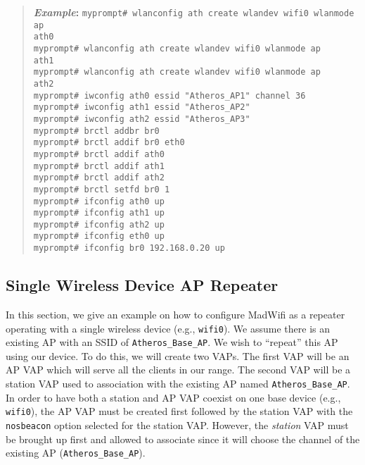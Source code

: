 \documentclass[10pt,fullpage]{article}
\newcommand{\mytt}[1]{{\texttt{#1}}}
\newcommand{\cmd}[1]{{\texttt{myprompt\# #1}}}
\newenvironment{example}{\begin{quote}\textbf{\textit{Example}:}}{\end{quote}}
\begin{document}
\begin{example}
  \cmd{wlanconfig ath create wlandev wifi0 wlanmode ap}\\
  \mytt{ath0}\\
  \cmd{wlanconfig ath create wlandev wifi0 wlanmode ap}\\
  \mytt{ath1}\\
  \cmd{wlanconfig ath create wlandev wifi0 wlanmode ap}\\
  \mytt{ath2}\\
  \cmd{iwconfig ath0 essid "Atheros\_AP1" channel 36}\\
  \cmd{iwconfig ath1 essid "Atheros\_AP2"}\\
  \cmd{iwconfig ath2 essid "Atheros\_AP3"}\\
  \cmd{brctl addbr br0}\\
  \cmd{brctl addif br0 eth0}\\
  \cmd{brctl addif ath0}\\
  \cmd{brctl addif ath1}\\
  \cmd{brctl addif ath2}\\
  \cmd{brctl setfd br0 1}\\
  \cmd{ifconfig ath0 up}\\
  \cmd{ifconfig ath1 up}\\
  \cmd{ifconfig ath2 up}\\
  \cmd{ifconfig eth0 up}\\
  \cmd{ifconfig br0 192.168.0.20 up}
\end{example}

\subsection{Single Wireless Device AP Repeater}
In this section, we give an example on how to configure MadWifi as a
repeater operating with a single wireless device (e.g., \mytt{wifi0}).
We assume there is an existing AP with an SSID of
\mytt{Atheros\_Base\_AP}.  We wish to ``repeat'' this AP using our
device.  To do this, we will create two VAPs.  The first VAP will be
an AP VAP which will serve all the clients in our range.  The second
VAP will be a station VAP used to association with the existing AP
named \mytt{Atheros\_Base\_AP}.  In order to have both a station and
AP VAP coexist on one base device (e.g., \mytt{wifi0}), the AP VAP
must be created first followed by the station VAP with the
\mytt{nosbeacon} option selected for the station VAP.  However, the
\emph{station} VAP must be brought up first and allowed to associate
since it will choose the channel of the existing AP
(\mytt{Atheros\_Base\_AP}).
\end{document}
